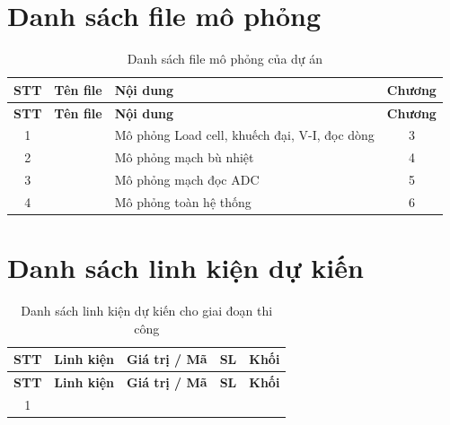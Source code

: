 \chapter{Danh sách file mô phỏng}
\label{chap:pl:file-mo-phong}

\begin{longtable}{|c|l|l|c|}
    \caption{Danh sách file mô phỏng của dự án}
    \label{tab:pl:file-mo-phong} \\
    \hline
    \textbf{STT} & \textbf{Tên file} & \textbf{Nội dung} & \textbf{Chương} \\ \hline
    \endfirsthead
    \hline
    \textbf{STT} & \textbf{Tên file} & \textbf{Nội dung} & \textbf{Chương} \\ \hline
    \endhead
    1 & \TODO{} & Mô phỏng Load cell, khuếch đại, V-I, đọc dòng & 3 \\ \hline
    2 & \TODO{} & Mô phỏng mạch bù nhiệt                       & 4 \\ \hline
    3 & \TODO{} & Mô phỏng mạch đọc ADC                        & 5 \\ \hline
    4 & \TODO{} & Mô phỏng toàn hệ thống                       & 6 \\ \hline
\end{longtable}

\chapter{Danh sách linh kiện dự kiến}
\label{chap:pl:bom}

\begin{longtable}{|c|l|l|c|l|}
    \caption{Danh sách linh kiện dự kiến cho giai đoạn thi công}
    \label{tab:pl:bom} \\
    \hline
    \textbf{STT} & \textbf{Linh kiện} & \textbf{Giá trị / Mã} & \textbf{SL} & \textbf{Khối} \\ \hline
    \endfirsthead
    \hline
    \textbf{STT} & \textbf{Linh kiện} & \textbf{Giá trị / Mã} & \textbf{SL} & \textbf{Khối} \\ \hline
    \endhead
    1 & \TODO{} & \TODO{} & \TODO{} & \TODO{} \\ \hline
\end{longtable}
